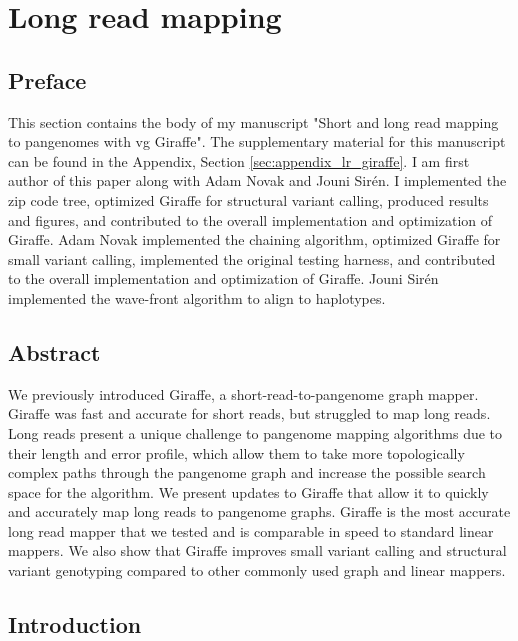\documentclass[11pt]{ucscthesis}
\begin{document}
\chapter{Long read mapping}
\label{chapter:lr-giraffe}
\section{Preface}
This section contains the body of my manuscript "Short and long read mapping to pangenomes with vg Giraffe".
The supplementary material for this manuscript can be found in the Appendix, Section \ref{sec:appendix_lr_giraffe}.
I am first author of this paper along with Adam Novak and Jouni Sirén.
I implemented the zip code tree, optimized Giraffe for structural variant calling, produced results and figures, and contributed to the overall implementation and optimization of Giraffe.
Adam Novak implemented the chaining algorithm, optimized Giraffe for small variant calling, implemented the original testing harness, and contributed to the overall implementation and optimization of Giraffe.
Jouni Sirén implemented the wave-front algorithm to align to haplotypes.

\section{Abstract}

We previously introduced Giraffe, a short-read-to-pangenome graph mapper. 
Giraffe was fast and accurate for short reads, but struggled to map long reads.
Long reads present a unique challenge to pangenome mapping algorithms due to their length and error profile, which allow them to take more topologically complex paths through the pangenome graph and increase the possible search space for the algorithm.
We present updates to Giraffe that allow it to quickly and accurately map long reads to pangenome graphs.
Giraffe is the most accurate long read mapper that we tested and is comparable in speed to standard linear mappers.
We also show that Giraffe improves small variant calling and structural variant genotyping compared to other commonly used graph and linear mappers.    


\section{Introduction}
\end{document}
